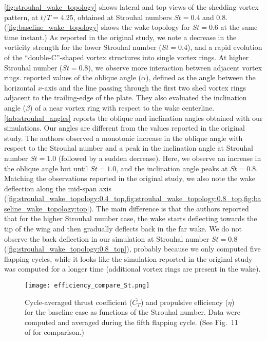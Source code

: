 \cref{fig:strouhal_wake_topology} shows lateral and top views of the shedding vortex pattern, at $t/T = 4.25$, obtained at Strouhal numbers $St = 0.4$ and $0.8$.
(\cref{fig:baseline_wake_topology} shows the wake topology for $St = 0.6$ at the same time instant.)
As reported in the original study, we note a decrease in the vorticity strength for the lower Strouhal number ($St = 0.4$), and a rapid evolution of the ``double-C''-shaped vortex structures into single vortex rings.
At higher Strouhal number ($St = 0.8$), we observe more interaction between adjacent vortex rings.
\citet{li_dong_2016} reported values of the oblique angle ($\alpha$), defined as the angle between the horizontal $x$-axis and the line passing through the first two shed vortex rings adjacent to the trailing-edge of the plate.
They also evaluated the inclination angle ($\beta$) of a near vortex ring with respect to the wake centerline.
\cref{tab:strouhal_angles} reports the oblique and inclination angles obtained with our simulations.
Our angles are different from the values reported in the original study.
The authors observed a monotonic increase in the oblique angle with respect to the Strouhal number and a peak in the inclination angle at Strouhal number $St = 1.0$ (followed by a sudden decrease).
Here, we observe an increase in the oblique angle but until $St = 1.0$, and the inclination angle peaks at $St = 0.8$.
Matching the observations reported in the original study, we also note the wake deflection along the mid-span axis (\cref{fig:strouhal_wake_topology:0.4_top,fig:strouhal_wake_topology:0.8_top,fig:baseline_wake_topology:top}).
The main difference is that the authors reported that for the higher Strouhal number case, the wake starts deflecting towards the tip of the wing and then gradually deflects back in the far wake.
We do not observe the back deflection in our simulation at Strouhal number $St = 0.8$ (\cref{fig:strouhal_wake_topology:0.8_top}), probably because we only computed five flapping cycles, while it looks like the simulation reported in the original study was computed for a longer time (additional vortex rings are present in the wake).

\begin{figure}[!h]
  \centering
  \texttt{[image: efficiency\_compare\_St.png]}
  \caption{Cycle-averaged thrust coefficient ($\overline{C_T}$) and propulsive efficiency ($\eta$) for the baseline case as functions of the Strouhal number. Data were computed and averaged during the fifth flapping cycle. (See Fig.~11 of \citet{li_dong_2016} for comparison.)}
  \label{fig:strouhal_propulsive_efficiency}
\end{figure}

